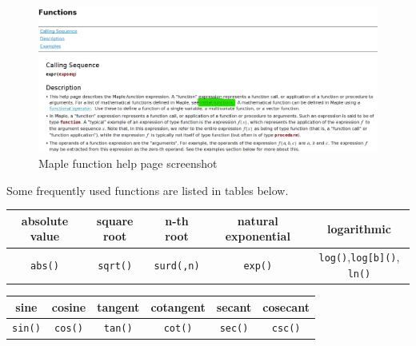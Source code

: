 \documentclass[]{book}
\theoremstyle{definition}
\theoremstyle{definition}
\theoremstyle{definition}
\theoremstyle{remark}
\begin{document}
\begin{figure}
\centering
\includegraphics{figs/Initial-Functions.PNG}
\caption{Maple function help page screenshot}
\end{figure}

Some frequently used functions are listed in tables below.

\begin{longtable}[]{@{}ccccc@{}}
\toprule
absolute value & square root & n-th root & natural exponential & logarithmic\tabularnewline
\midrule
\endhead
\texttt{abs()} & \texttt{sqrt()} & \texttt{surd(,n)} & \texttt{exp()} & \texttt{log()},\texttt{log{[}b{]}()}, \texttt{ln()}\tabularnewline
\bottomrule
\end{longtable}

\begin{longtable}[]{@{}cccccc@{}}
\toprule
sine & cosine & tangent & cotangent & secant & cosecant\tabularnewline
\midrule
\endhead
\texttt{sin()} & \texttt{cos()} & \texttt{tan()} & \texttt{cot()} & \texttt{sec()} & \texttt{csc()}\tabularnewline
\bottomrule
\end{longtable}
\end{document}
